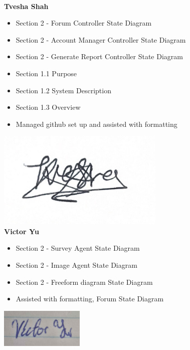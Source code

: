 \documentclass[]{article}
\numberwithin{figure}{section}
\begin{document}
\\
\textbf{Tvesha Shah}
\begin{itemize}
    \setlength\itemindent{2em}
    \item Section 2 - Forum Controller State Diagram 
    \item Section 2 - Account Manager Controller State Diagram 
    \item Section 2 - Generate Report Controller State Diagram 
    \item Section 1.1 Purpose
    \item Section 1.2 System Description
    \item Section 1.3 Overview
    \item Managed github set up and assisted with formatting
\end{itemize} 
\includegraphics[width=0.6\textwidth]{Tvesha.png}
\\
\textbf{Victor Yu}
\begin{itemize}
    \setlength\itemindent{2em}
    \item Section 2 - Survey Agent State Diagram 
    \item Section 2 - Image Agent State Diagram 
    \item Section 2 - Freeform diagram State Diagram 
    \item Assisted with formatting, Forum State Diagram
\end{itemize} 
\includegraphics[width=0.3\textwidth]{Victor.png}
\end{document}
